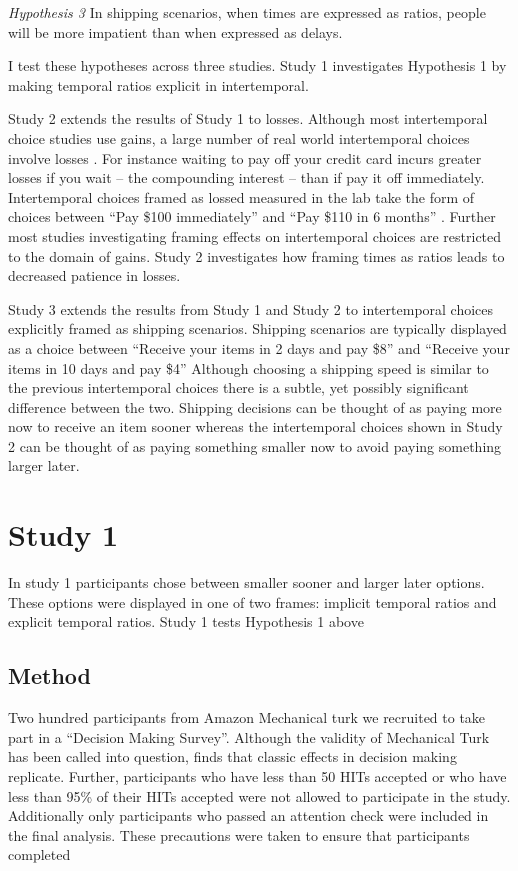 \documentclass[]{article}
\begin{document}
\textit{Hypothesis 3} In shipping scenarios, when times are expressed as ratios, people will be more impatient than when expressed as delays. 



I test these hypotheses across three studies.
Study 1 investigates Hypothesis 1 by making temporal ratios explicit in intertemporal. 

Study 2 extends the results of Study 1 to losses. 
Although most intertemporal choice studies use gains, a large number of real world intertemporal choices involve losses \cite{Hardisty2013}. 
For instance waiting to pay off your credit card incurs greater losses if you wait -- the compounding interest -- than if pay it off immediately.
Intertemporal choices framed as lossed measured in the lab take the form of choices between ``Pay \$100 immediately'' and  ``Pay \$110 in 6 months'' \cite{Hardisty2015}.
Further most studies investigating framing effects on intertemporal choices are restricted to the domain of gains. 
Study 2 investigates how framing times as ratios leads to decreased patience in losses. 

Study 3 extends the results from Study 1 and Study 2 to intertemporal choices explicitly framed as shipping scenarios.
Shipping scenarios are typically displayed as a choice between ``Receive your items in 2 days and pay \$8'' and ``Receive your items in 10 days and pay \$4''
Although choosing a shipping speed is similar to the previous intertemporal choices there is a subtle, yet possibly significant difference between the two.
Shipping decisions can be thought of as paying more now to receive an item sooner whereas the intertemporal choices shown in Study 2 can be thought of as paying something smaller now to avoid paying something larger later. 



\section{Study 1}
In study 1 participants chose between smaller sooner and larger later options. 
These options were displayed in one of two frames: implicit temporal ratios and explicit temporal ratios. 
Study 1 tests Hypothesis 1 above

\subsection{Method}
Two hundred participants from Amazon Mechanical turk we recruited to take part in a ``Decision Making Survey''. 
Although the validity of Mechanical Turk has been called into question,  finds that classic effects in decision making replicate. 
Further, participants who have less than 50 HITs accepted or  who have less than 95\% of their HITs accepted were not allowed to participate in the study. 
Additionally only participants who passed an attention check were included in the final analysis.
These precautions were taken to ensure that participants completed
\end{document}
